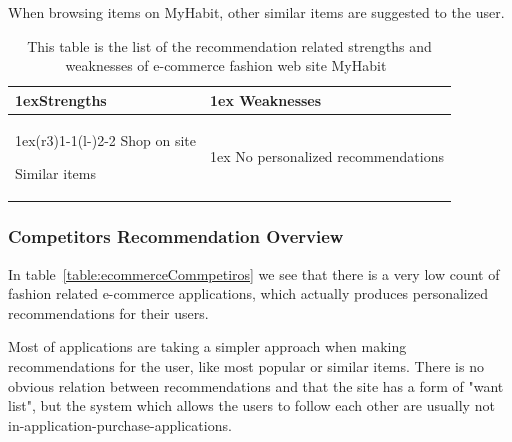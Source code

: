     When browsing items on MyHabit, other similar items are suggested to the user.
    \begin{table}[H]
                    \centering
                    \begin{tabularx}{\linewidth}{>{\parskip1ex}X@{\kern4\tabcolsep}>{\parskip1ex}X}
                    \toprule
                    \hfil\bfseries Strengths
                    &
                    \hfil\bfseries Weaknesses
                    \\\cmidrule(r{3\tabcolsep}){1-1}\cmidrule(l{-\tabcolsep}){2-2}
                Shop on site \par
                Similar items \par
             &
                No personalized recommendations \par
            \\ \bottomrule
        \end{tabularx}
        \caption[Recommendation related strengths and weaknesses of MyHabit~\cite{MyHabit}]{This table is the list of the recommendation related strengths and weaknesses of e-commerce fashion web site MyHabit~\cite{MyHabit}}
        \label{table:ecommenreceMyHabit}
    \end{table}

\subsubsection{Competitors Recommendation Overview} %
\label{par:competitors_recommendation_overview}
    In table~\ref{table:ecommerceCommpetiros} we see that there is a very low count of fashion related e-commerce applications, which actually produces personalized recommendations for their users.

    Most of applications are taking a simpler approach when making recommendations for the user, like most popular or similar items.
    There is no obvious relation between recommendations and that the site has a form of "want list", but the system which allows the users to follow each other are usually not in-application-purchase-applications.

